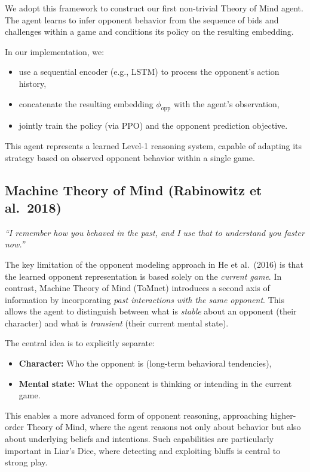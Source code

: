 \documentclass{article}
\begin{document}
We adopt this framework to construct our first non-trivial Theory of Mind agent. The agent learns to infer opponent behavior from the sequence of bids and challenges within a game and conditions its policy on the resulting embedding.

In our implementation, we:
\begin{itemize}
    \item use a sequential encoder (e.g., LSTM) to process the opponent’s action history,
    \item concatenate the resulting embedding $\phi_{\text{opp}}$ with the agent’s observation,
    \item jointly train the policy (via PPO) and the opponent prediction objective.
\end{itemize}

This agent represents a learned Level-1 reasoning system, capable of adapting its strategy based on observed opponent behavior within a single game.

\subsection{Machine Theory of Mind (Rabinowitz et al.\ 2018)}

\begin{center}
\textit{``I remember how you behaved in the past, and I use that to understand you faster now.''}
\end{center}

The key limitation of the opponent modeling approach in He et al.\ (2016) is that the learned opponent representation is based solely on the \emph{current game}. In contrast, Machine Theory of Mind (ToMnet) introduces a second axis of information by incorporating \emph{past interactions with the same opponent}. This allows the agent to distinguish between what is \emph{stable} about an opponent (their character) and what is \emph{transient} (their current mental state).

The central idea is to explicitly separate:
\begin{itemize}
    \item \textbf{Character:} Who the opponent is (long-term behavioral tendencies),
    \item \textbf{Mental state:} What the opponent is thinking or intending in the current game.
\end{itemize}

This enables a more advanced form of opponent reasoning, approaching higher-order Theory of Mind, where the agent reasons not only about behavior but also about underlying beliefs and intentions. Such capabilities are particularly important in Liar’s Dice, where detecting and exploiting bluffs is central to strong play.
\end{document}

